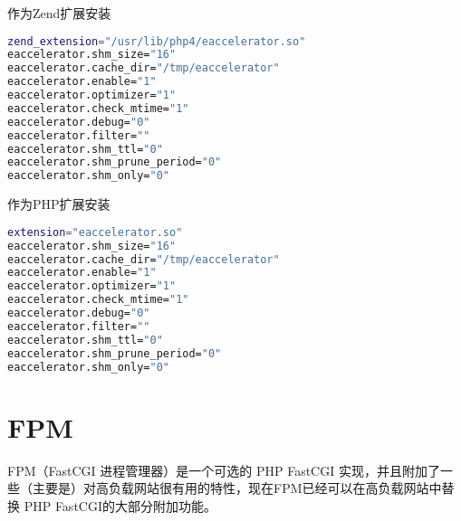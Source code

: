 \begin{compactitem}
\item 作为Zend扩展安装

\begin{lstlisting}[language=bash]
zend_extension="/usr/lib/php4/eaccelerator.so"
eaccelerator.shm_size="16"
eaccelerator.cache_dir="/tmp/eaccelerator"
eaccelerator.enable="1"
eaccelerator.optimizer="1"
eaccelerator.check_mtime="1"
eaccelerator.debug="0"
eaccelerator.filter=""
eaccelerator.shm_ttl="0"
eaccelerator.shm_prune_period="0"
eaccelerator.shm_only="0"
\end{lstlisting}

\item 作为PHP扩展安装

\begin{lstlisting}[language=bash]
extension="eaccelerator.so"
eaccelerator.shm_size="16"
eaccelerator.cache_dir="/tmp/eaccelerator"
eaccelerator.enable="1"
eaccelerator.optimizer="1"
eaccelerator.check_mtime="1"
eaccelerator.debug="0"
eaccelerator.filter=""
eaccelerator.shm_ttl="0"
eaccelerator.shm_prune_period="0"
eaccelerator.shm_only="0"
\end{lstlisting}

\end{compactitem}



\section{FPM}

FPM（FastCGI 进程管理器）是一个可选的 PHP FastCGI 实现，并且附加了一些（主要是）对高负载网站很有用的特性，现在FPM已经可以在高负载网站中替换 PHP FastCGI的大部分附加功能。


